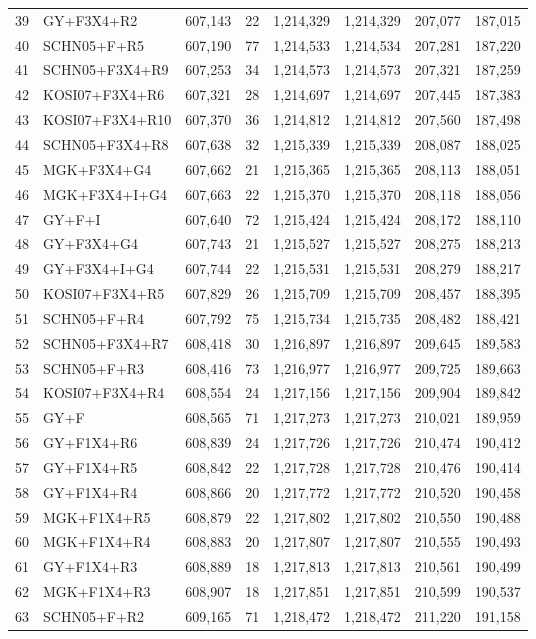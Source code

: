 \begin{longtable}{rlrrrrrr}
39&GY+F3X4+R2&607,143&22&1,214,329&1,214,329&207,077&187,015\\
40&SCHN05+F+R5&607,190&77&1,214,533&1,214,534&207,281&187,220\\
41&SCHN05+F3X4+R9&607,253&34&1,214,573&1,214,573&207,321&187,259\\
42&KOSI07+F3X4+R6&607,321&28&1,214,697&1,214,697&207,445&187,383\\
43&KOSI07+F3X4+R10&607,370&36&1,214,812&1,214,812&207,560&187,498\\
44&SCHN05+F3X4+R8&607,638&32&1,215,339&1,215,339&208,087&188,025\\
45&MGK+F3X4+G4&607,662&21&1,215,365&1,215,365&208,113&188,051\\
46&MGK+F3X4+I+G4&607,663&22&1,215,370&1,215,370&208,118&188,056\\
47&GY+F+I&607,640&72&1,215,424&1,215,424&208,172&188,110\\
48&GY+F3X4+G4&607,743&21&1,215,527&1,215,527&208,275&188,213\\
49&GY+F3X4+I+G4&607,744&22&1,215,531&1,215,531&208,279&188,217\\
50&KOSI07+F3X4+R5&607,829&26&1,215,709&1,215,709&208,457&188,395\\
51&SCHN05+F+R4&607,792&75&1,215,734&1,215,735&208,482&188,421\\
52&SCHN05+F3X4+R7&608,418&30&1,216,897&1,216,897&209,645&189,583\\
53&SCHN05+F+R3&608,416&73&1,216,977&1,216,977&209,725&189,663\\
54&KOSI07+F3X4+R4&608,554&24&1,217,156&1,217,156&209,904&189,842\\
55&GY+F&608,565&71&1,217,273&1,217,273&210,021&189,959\\
56&GY+F1X4+R6&608,839&24&1,217,726&1,217,726&210,474&190,412\\
57&GY+F1X4+R5&608,842&22&1,217,728&1,217,728&210,476&190,414\\
58&GY+F1X4+R4&608,866&20&1,217,772&1,217,772&210,520&190,458\\
59&MGK+F1X4+R5&608,879&22&1,217,802&1,217,802&210,550&190,488\\
60&MGK+F1X4+R4&608,883&20&1,217,807&1,217,807&210,555&190,493\\
61&GY+F1X4+R3&608,889&18&1,217,813&1,217,813&210,561&190,499\\
62&MGK+F1X4+R3&608,907&18&1,217,851&1,217,851&210,599&190,537\\
63&SCHN05+F+R2&609,165&71&1,218,472&1,218,472&211,220&191,158\\

\end{longtable}
